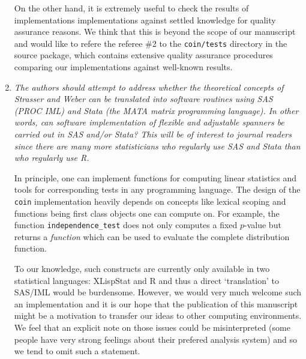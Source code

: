 \documentclass[11pt]{article}
\begin{document}
\begin{enumerate}
On the other hand, it is extremely useful to check the results of implementations
implementations against settled knowledge for quality assurance reasons. We
think that this is beyond the scope of our manuscript and would like to
refere the referee \#2 to the \texttt{coin/tests} directory in the source
package, which contains extensive quality assurance procedures comparing our
implementations against well-known results.

\item \textsl{The authors should attempt to address whether the theoretical concepts of
              Strasser and Weber can be translated into software routines using 
              SAS (PROC IML) and Stata (the MATA matrix programming language). In other 
              words, can software implementation of flexible and adjustable
              spanners be carried out in SAS and/or Stata? This will be of interest to
              journal readers since there are many more statisticians who regularly use 
              SAS and Stata than who regularly use R.}

In principle, one can implement functions for computing linear statistics
and tools for corresponding tests in any programming language. The design of
the \texttt{coin} implementation heavily depends on concepts like lexical
scoping and functions being first class objects one can compute on. For
example, the function \texttt{independence\_test} does not only computes a
fixed $p$-value but returns a \textit{function} which can be used to
evaluate the complete distribution function.

To our knowledge, such constructs are currently only available in two
statistical languages: \textsf{XLispStat} and \textsf{R} and thus a direct
`translation' to \textsf{SAS/IML} would be burdensome. However, we would
very much welcome such an implementation and it is our hope that the
publication of this manuscript might be a motivation to transfer our ideas
to other computing environments. We feel that an explicit note on those
issues could be misinterpreted (some people have very strong feelings about
their prefered analysis system) and so we tend to omit such a statement.

\end{enumerate}
\end{document}
